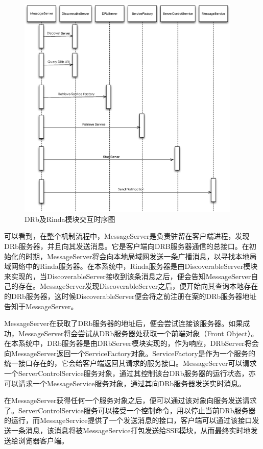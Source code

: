 \begin{figure}[h]
\centering
\includegraphics[width=0.95\textwidth]{images/overview/drb_rinda_timing.eps}
\caption{DRb及Rinda模块交互时序图}
\label{fig-drb-rinda-timing}
\end{figure}

可以看到，在整个机制流程中，MessageServer是负责驻留在客户端进程，发现DRb服务器，并且向其发送消息。它是客户端向DRB服务器通信的总接口。在初始化的时期，MessageServer将会向本地局域网发送一条广播消息，以寻找本地局域网络中的Rinda服务器。在本系统中，Rinda服务器是由DiscoverableServer模块来实现的，当DiscoverableServer接收到该条消息之后，便会告知MessageServer自己的存在。MessageServer发现DiscoverableServer之后，便开始向其查询本地存在的DRb服务器，这时候DiscoverableServer便会将之前注册在案的DRb服务器地址告知于MessageServer。

MessageServer在获取了DRb服务器的地址后，便会尝试连接该服务器。如果成功，MessageServer将会尝试从DRb服务器处获取一个前端对象（Front Object）。在本系统中，DRb服务器是由DRbServer模块实现的，作为响应，DRbServer将会向MessageServer返回一个ServiceFactory对象。ServiceFactory是作为一个服务的统一接口存在的，它会给客户端返回其请求的服务接口。MessageServer可以请求一个ServerControlService服务对象，通过其控制该台DRb服务器的运行状态，亦可以请求一个MessageService服务对象，通过其向DRb服务器发送实时消息。

在MessageServer获得任何一个服务对象之后，便可以通过该对象向服务发送请求了。ServerControlService服务可以接受一个控制命令，用以停止当前DRb服务器的运行，而MessageService提供了一个发送消息的接口，客户端可以通过该接口发送一条消息，该消息将被MessageService打包发送给SSE模块，从而最终实时地发送给浏览器客户端。

